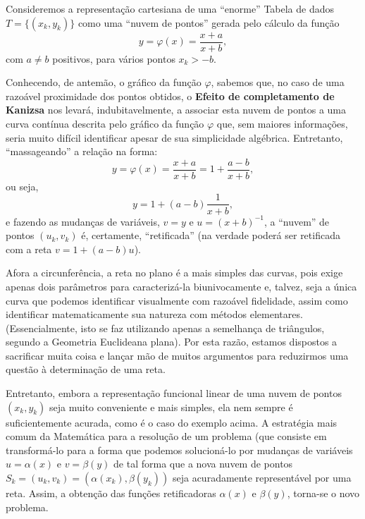 \begin{example}

    Consideremos a representação cartesiana de uma ``enorme'' Tabela de dados \(T = \{(x_k, y_k)\}\) como uma ``nuvem de pontos'' gerada pelo cálculo da função
    \[y = \varphi(x) = \dfrac{x+a}{x+b},\]
    com \(a \ne b\) positivos, para vários pontos \(x_k > -b\).
    
    Conhecendo, de antemão, o gráfico da função \(\varphi\), sabemos que, no caso de uma razoável proximidade dos pontos obtidos, o \textbf{Efeito de completamento de Kanizsa} nos levará, indubitavelmente, a associar esta nuvem de pontos a uma curva contínua descrita pelo gráfico da função \(\varphi\) que, sem maiores informações, seria muito difícil identificar apesar de sua simplicidade algébrica. Entretanto, ``massageando'' a relação na forma:
    \[y = \varphi(x) = \dfrac{x+a}{x+b} = 1+\dfrac{a-b}{x+b},\]
    ou seja,
    \[y = 1+(a-b)\dfrac{1}{x+b},\]
    e fazendo as mudanças de variáveis, \(v = y\) e \(u = (x+b)^{-1}\), a ``nuvem'' de pontos \((u_k, v_k)\) é, certamente, ``retificada'' (na verdade poderá ser retificada com a reta \(v = 1+(a-b)u\)).
\end{example}

    Afora a circunferência, a reta no plano é a mais simples das curvas, pois exige apenas dois parâmetros para caracterizá-la biunivocamente e, talvez, seja a única curva que podemos identificar visualmente com razoável fidelidade, assim como identificar matematicamente sua natureza com métodos elementares. (Essencialmente, isto se faz utilizando apenas a semelhança de triângulos, segundo a Geometria Euclideana plana). Por esta razão, estamos dispostos a sacrificar muita coisa e lançar mão de muitos argumentos para reduzirmos uma questão à determinação de uma reta.
    
    Entretanto, embora a representação funcional linear de uma nuvem de pontos \((x_k, y_k)\) seja muito conveniente e mais simples, ela nem sempre é suficientemente acurada, como é o caso do exemplo acima. A estratégia mais comum da Matemática para a resolução de um problema (que consiste em transformá-lo para a forma que podemos solucioná-lo por mudanças de variáveis \(u = \alpha(x)\) e \(v = \beta(y)\) de tal forma que a nova nuvem de pontos \(S_k = (u_k, v_k) = (\alpha(x_k), \beta(y_k))\) seja acuradamente representável por uma reta. Assim, a obtenção das funções retificadoras \(\alpha(x)\) e \(\beta(y)\), torna-se o novo problema.

